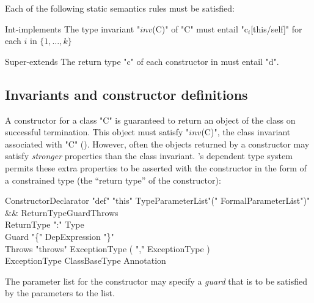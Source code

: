 Each of the following static semantics rules must be satisfied:

\begin{staticrule}{Int-implements}
The type invariant \xcdmath"$\mathit{inv}$(C)" of \xcd"C" must entail
\xcdmath"c$_i$[this/self]" for each $i$ in $\{1, \dots, k\}$
\end{staticrule}

\begin{staticrule}{Super-extends}
The return type \xcd"c" of each constructor in 
must entail \xcd"d".
\end{staticrule}

\subsection{Invariants and constructor definitions}

A constructor for a class \xcd"C" is guaranteed to return an object of the
class on successful termination. This object must satisfy  \xcdmath"$\mathit{inv}$(C)", the
class invariant associated with \xcd"C" ().
However,
often the objects returned by a constructor may satisfy {\em stronger}
properties than the class invariant. \Xten{}'s dependent type system
permits these extra properties to be asserted with the constructor in
the form of a constrained type (the ``return type'' of the constructor):

\begin{grammar}
ConstructorDeclarator \:
  \xcd"def" \xcd"this" TypeParameterList\opt \xcd"(" FormalParameterList\opt \xcd")" \\
  && ReturnType\opt Guard\opt Throws\opt \\
ReturnType    \: \xcd":" Type \\
Guard   \: "\{" DepExpression "\}" \\
Throws    \: \xcd"throws" ExceptionType  ( \xcd"," ExceptionType )\star \\
ExceptionType \: ClassBaseType Annotation\star \\
\end{grammar}

\label{ConstructorGuard}

The parameter list for the constructor
may specify a \emph{guard} that is to be satisfied by the parameters
to the list.

